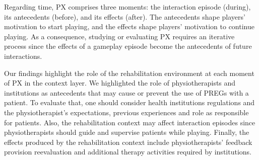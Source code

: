 Regarding time, \ac{PX} comprises three moments: the interaction episode (during), its antecedents (before), and its effects (after). The antecedents shape players' motivation to start playing, and the effects shape players' motivation to continue playing. As a consequence, studying or evaluating \ac{PX} requires an iterative process since the effects of a gameplay episode become the antecedents of future interactions.


Our findings highlight the role of the rehabilitation environment at each moment of \ac{PX} in the context layer. We highlighted the role of physiotherapists and institutions as antecedents that may cause or prevent the use of \acp{PREG} with a patient. To evaluate that, one should consider health institutions regulations and the physiotherapist's expectations, previous experiences and role as responsible for patients. Also, the rehabilitation context may affect interaction episodes since physiotherapists should guide and supervise patients while playing. Finally, the effects produced by the rehabilitation context include physiotherapists' feedback provision reevaluation and additional therapy activities required by institutions.

